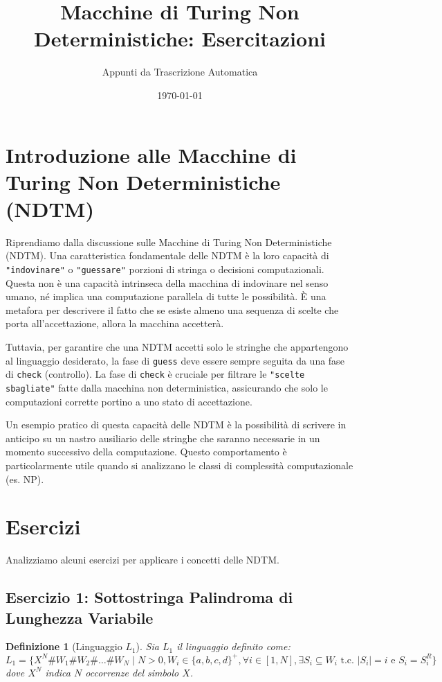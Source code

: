 \documentclass[a4paper]{article}
\title{Macchine di Turing Non Deterministiche: Esercitazioni}
\author{Appunti da Trascrizione Automatica}
\date{\today}
\newtheorem{definition}{Definizione}
\begin{document}
\maketitle
\tableofcontents
\newpage

\section{Introduzione alle Macchine di Turing Non Deterministiche (NDTM)}

Riprendiamo dalla discussione sulle Macchine di Turing Non Deterministiche (NDTM).
Una caratteristica fondamentale delle NDTM è la loro capacità di \texttt{"indovinare"} o \texttt{"guessare"} porzioni di stringa o decisioni computazionali. Questa non è una capacità intrinseca della macchina di indovinare nel senso umano, né implica una computazione parallela di tutte le possibilità. È una metafora per descrivere il fatto che se esiste almeno una sequenza di scelte che porta all'accettazione, allora la macchina accetterà.

Tuttavia, per garantire che una NDTM accetti solo le stringhe che appartengono al linguaggio desiderato, la fase di \texttt{guess} deve essere sempre seguita da una fase di \texttt{check} (controllo). La fase di \texttt{check} è cruciale per filtrare le \texttt{"scelte sbagliate"} fatte dalla macchina non deterministica, assicurando che solo le computazioni corrette portino a uno stato di accettazione.

Un esempio pratico di questa capacità delle NDTM è la possibilità di scrivere in anticipo su un nastro ausiliario delle stringhe che saranno necessarie in un momento successivo della computazione. Questo comportamento è particolarmente utile quando si analizzano le classi di complessità computazionale (es. NP).

\section{Esercizi}

Analizziamo alcuni esercizi per applicare i concetti delle NDTM.

\subsection{Esercizio 1: Sottostringa Palindroma di Lunghezza Variabile}

\begin{definition}[Linguaggio $L_1$]
Sia $L_1$ il linguaggio definito come:
\[
L_1 = \{ X^N \# W_1 \# W_2 \# \dots \# W_N \mid N > 0, W_i \in \{a,b,c,d\}^+, \forall i \in [1, N], \exists S_i \subseteq W_i \text{ t.c. } |S_i| = i \text{ e } S_i = S_i^R \}
\]
dove $X^N$ indica $N$ occorrenze del simbolo $X$.
\end{definition}
\end{document}
